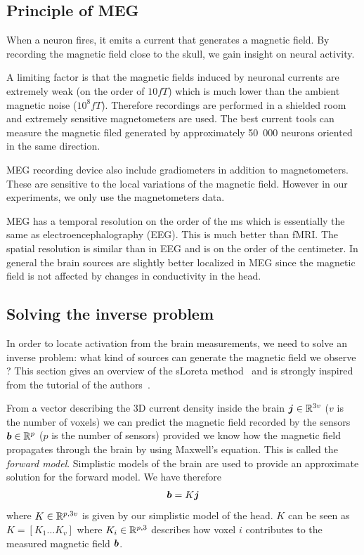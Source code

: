 \subsection{Principle of MEG}
When a neuron fires, it emits a current that generates a magnetic field. By
recording the magnetic field close to the skull, we gain insight on neural
activity.

A limiting factor is that the magnetic fields induced by neuronal currents are
extremely weak (on the order of $10 fT$) which is much lower than the ambient magnetic noise ($10^8 fT$). Therefore recordings are performed in a shielded room and extremely sensitive magnetometers are used.
The best current tools can measure the magnetic filed generated by approximately 50~000 neurons oriented in the same direction.

MEG recording device also include gradiometers in addition to magnetometers.
These are sensitive to the local variations of the magnetic field. However in our experiments, we only use the magnetometers data.

MEG has a temporal resolution on the order of the ms which is essentially the same as electroencephalography (EEG). This is much better than fMRI. The spatial
resolution is similar than in EEG and is on the order of the centimeter.
In general the brain sources are slightly better localized in MEG since the
magnetic field is not affected by changes in conductivity in the head.


\subsection{Solving the inverse problem}
In order to locate activation from the brain measurements, we need to solve an inverse problem: what kind of sources can generate the magnetic field we
observe ? This section gives an overview of the sLoreta
method~\cite{pascual2002standardized} and is strongly inspired from the tutorial
of the authors~\cite{pascual2007discrete}.

From a vector describing the 3D current density inside the brain $\boldsymbol{j} \in \mathbb{R}^{3v}$
($v$ is the number of voxels) we
can predict the magnetic field recorded by the sensors $\boldsymbol{b} \in \mathbb{R}^p$ ($p$ is the number of sensors) provided
we know how the magnetic field propagates through the brain by using Maxwell's equation. This is called the \emph{forward model}. Simplistic models of the
brain are used to provide an approximate solution for the forward model.
We have therefore
\begin{align}
  \boldsymbol{b} = K \boldsymbol{j}
  \label{eq:maxwell}
\end{align}
where $K \in \mathbb{R}^{p, 3v}$ is given by our simplistic model of the head.
$K$ can be seen as $K  = [K_1 \dots K_{v}]$ where $K_i \in \mathbb{R}^{p, 3}$ describes how voxel $i$ contributes to the measured magnetic field $\boldsymbol{b}$.

